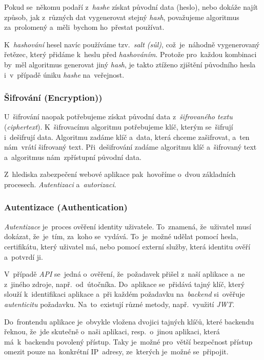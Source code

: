 \documentclass[10pt,a4paper]{article}
\begin{document}
        Pokud se~někomu podaří z~\emph{hashe} získat původní data (heslo), nebo dokáže najít způsob, jak z~různých dat vygenerovat stejný \emph{hash}, považujeme algoritmus za~prolomený a~měli~bychom ho~přestat používat.
        
        K~\emph{hashování} hesel navíc používáme tzv.~\emph{salt (sůl)}, což~je~náhodně vygenerovaný řetězec, který přidáme k~heslu před \emph{hashováním}. Protože pro~každou kombinaci by~měl algoritmus generovat jiný \emph{hash}, je takto ztíženo zjištění původního hesla i~v~případě úniku \emph{hashe} na~veřejnost.
        
        \subsubsection{Šifrování (Encryption))}
        U~šifrování naopak potřebujeme získat původní data z~\emph{šifrovaného textu} (\emph{ciphertext}). K~šifrovacímu algoritmu potřebujeme klíč, kterým se~šifrují i~dešifrují data. Algoritmu zadáme klíč a~data, která chceme zašifrovat, a~ten nám~vrátí šifrovaný text. Při~dešifrování zadáme algoritmu klíč a~šifrovaný text a~algoritmus nám~zpřístupní původní data.

        Z~hlediska zabezpečení webové aplikace pak~hovoříme o~dvou základních procesech. \emph{Autentizaci} a~\emph{autorizaci}.

            \subsubsection{Autentizace (Authentication)}
            \emph{Autentizace} je~proces ověření identity uživatele. To~znamená, že~uživatel musí dokázat, že~je~tím, za~koho se~vydává. To~je~možné udělat pomocí hesla, certifikátu, který uživatel má, nebo pomocí externí služby, která identitu ověří a~potvrdí ji.
            
            V~případě \emph{API} se~jedná o~ověření, že~požadavek přišel z~naší aplikace a~ne z~jiného zdroje, např.~od~útočníka. Do~aplikace se~přidává tajný klíč, který slouží k~identifikaci aplikace a~při každém požadavku na~\emph{backend} si~ověřuje \emph{autenticitu} požadavku. Na~to~existují různé metody, např.~využití \emph{JWT}.
            
            Do~frontendu aplikace je~obvykle vložena dvojici tajných klíčů, které backendu řeknou, že~jde skutečně o~naši aplikaci, resp.~o~jinou aplikaci, která má~k~backendu povolený přístup. Taky je~možné pro~větší bezpečnost přístup omezit pouze na~konkrétní IP~adresy, ze~kterých je~možné se~připojit.
\end{document}
